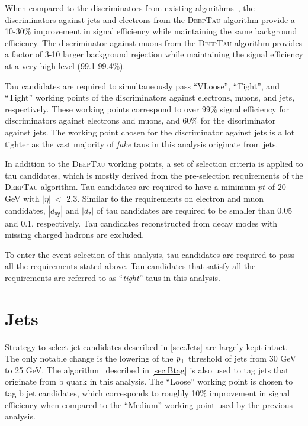 When compared to the discriminators from existing algorithms~\cite{CMS:2018jrd,CMS:2015pac}, the discriminators against jets and electrons from the \textsc{DeepTau} algorithm provide a 10-30\% improvement in signal efficiency while maintaining the same background efficiency. The discriminator against muons from the \textsc{DeepTau} algorithm provides a factor of 3-10 larger background rejection while maintaining the signal efficiency at a very high level (99.1-99.4\%).

Tau candidates are required to simultaneously pass ``VLoose'', ``Tight'', and ``Tight'' working points of the discriminators against electrons, muons, and jets, respectively. These working points correspond to over 99\% signal efficiency for discriminators against electrons and muons, and 60\% for the discriminator against jets. The working point chosen for the discriminator against jets is a lot tighter as the vast majority of \emph{fake} taus in this analysis originate from jets.

In addition to the \textsc{DeepTau} working points, a set of selection criteria is applied to tau candidates, which is mostly derived from the pre-selection requirements of the \textsc{DeepTau} algorithm. Tau candidates are required to have a minimum $pt$ of 20 GeV with $|\eta|~<$ 2.3. Similar to the requirements on electron and muon candidates, $|d_{\textsf{xy}}|$ and $|d_{\textsf{z}}|$ of tau candidates are required to be smaller than 0.05 and 0.1, respectively. Tau candidates reconstructed from decay modes with missing charged hadrons are excluded.

To enter the event selection of this analysis, tau candidates are required to pass all the requirements stated above. Tau candidates that satisfy all the requirements are referred to as ``\emph{tight}'' taus in this analysis.

\section{Jets}
\label{sec:JME}

Strategy to select jet candidates described in \autoref{sec:Jets} are largely kept intact. The only notable change is the lowering of the $p_{\textsf{T}}$ threshold of jets from 30 GeV to 25 GeV. The \DeepJ algorithm~\cite{Bols:2020bkb} described in \autoref{sec:Btag} is also used to tag jets that originate from b quark in this analysis. The ``Loose'' working point is chosen to tag b jet candidates, which corresponds to roughly 10\% improvement in signal efficiency when compared to the ``Medium'' working point used by the previous analysis.